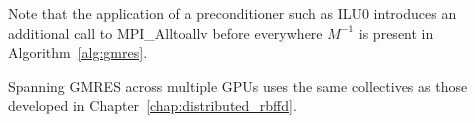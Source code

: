 Note that the application of a preconditioner such as ILU0 introduces an additional call to MPI\_Alltoallv before everywhere $M^{-1}$ is present in Algorithm~\ref{alg:gmres}.

Spanning GMRES across multiple GPUs uses the same collectives as those developed in Chapter~\ref{chap:distributed_rbffd}. 


% 
%

%
%


